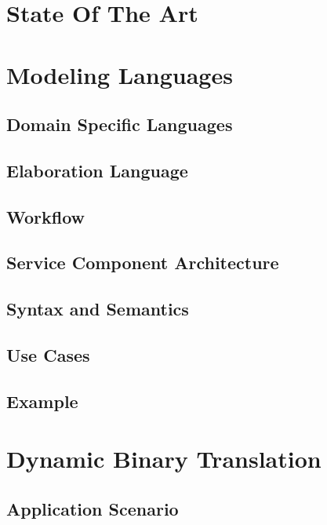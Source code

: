 \documentclass{report}
\begin{document}
    \section{State Of The Art}
    
    \section{Modeling Languages}
    
    \subsection{Domain Specific Languages}
    
    \subsection{Elaboration Language}
    
    \subsection{Workflow}
    
    \subsection{Service Component Architecture}
    
    \subsection{Syntax and Semantics}
    
    \subsection{Use Cases}
    
    \subsection{Example}
    
    \section{Dynamic Binary Translation}
    
    \subsection{Application Scenario}
    
\end{document}
